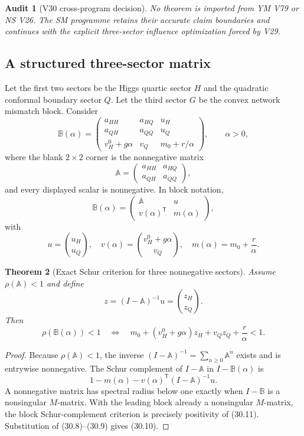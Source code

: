 \documentclass[11pt]{article}
\newtheorem{theorem}{Theorem}[section]
\newtheorem{audit}[theorem]{Audit}
\theoremstyle{remark}
\begin{document}
\begin{audit}[V30 cross-program decision]
\label{aud:v17v30-companions}
No theorem is imported from YM V79 or NS V26.  The SM programme retains
their accurate claim boundaries and continues with the explicit
three-sector influence optimization forced by V29.
\end{audit}

\subsection{A structured three-sector matrix}

Let the first two sectors be the Higgs quartic sector \(H\) and the
quadratic conformal boundary sector \(Q\).  Let the third sector \(G\)
be the convex network mismatch block.  Consider
\[
 \mathbb B(\alpha)
 =\begin{pmatrix}
 a_{HH}&a_{HQ}&u_H\\
 a_{QH}&a_{QQ}&u_Q\\
 v_H^0+g\alpha&v_Q&m_0+r/\alpha
 \end{pmatrix},
 \qquad \alpha>0,                                  \tag{30.5}
\]
where the blank \(2\times2\) corner is the nonnegative matrix
\[
 \mathbb A=
 \begin{pmatrix}a_{HH}&a_{HQ}\\a_{QH}&a_{QQ}\end{pmatrix},    \tag{30.6}
\]
and every displayed scalar is nonnegative.  In block notation,
\[
 \mathbb B(\alpha)
 =\begin{pmatrix}
 \mathbb A&u\\v(\alpha)^{\mathsf T}&m(\alpha)
 \end{pmatrix},                                   \tag{30.7}
\]
with
\[
 u=\binom{u_H}{u_Q},\quad
 v(\alpha)=\binom{v_H^0+g\alpha}{v_Q},\quad
 m(\alpha)=m_0+\frac r\alpha.                     \tag{30.8}
\]

\begin{theorem}[Exact Schur criterion for three nonnegative sectors]
\label{thm:v17v30-schur}
Assume \(\rho(\mathbb A)<1\) and define
\[
 z=(I-\mathbb A)^{-1}u
 =\binom{z_H}{z_Q}.                                \tag{30.9}
\]
Then
\[
 \boxed{
 \rho(\mathbb B(\alpha))<1
 \quad\Longleftrightarrow\quad
 m_0+(v_H^0+g\alpha)z_H+v_Qz_Q+\frac r\alpha<1.}  \tag{30.10}
\]
\end{theorem}

\begin{proof}
Because \(\rho(\mathbb A)<1\), the inverse
\((I-\mathbb A)^{-1}=\sum_{n\geq0}\mathbb A^n\) exists and is
entrywise nonnegative.  The Schur complement of
\(I-\mathbb A\) in \(I-\mathbb B(\alpha)\) is
\[
 1-m(\alpha)-v(\alpha)^{\mathsf T}
 (I-\mathbb A)^{-1}u.                              \tag{30.11}
\]
A nonnegative matrix has spectral radius below one exactly when
\(I-\mathbb B\) is a nonsingular \(M\)-matrix.  With the leading block
already a nonsingular \(M\)-matrix, the block Schur-complement criterion
is precisely positivity of (30.11).  Substitution of (30.8)--(30.9)
gives (30.10).
\end{proof}
\end{document}
